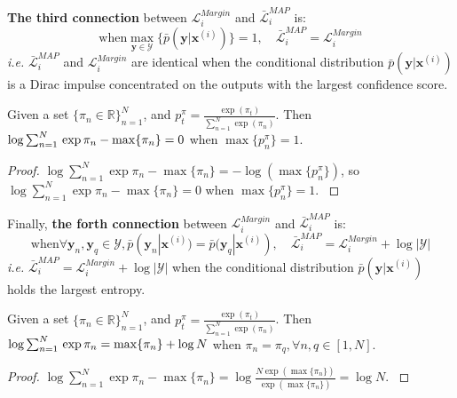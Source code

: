 \textbf{The third connection} between $\mathcal{L}^{Margin}_i$ and $\bar{\mathcal{L}}^{MAP}_i$ is: 
\begin{equation}
    \text{when} \max_{\mathbf{y}\in\mathcal{Y}}\{\bar{p}(\mathbf{y}|\mathbf{x}^{(i)})\}= 1, \quad \bar{\mathcal{L}}_i^{MAP}=\mathcal{L}^{Margin}_i 
    \label{equ:tight}
\end{equation}
\emph{i.e.} $\bar{\mathcal{L}}_i^{MAP}$ and $\mathcal{L}^{Margin}_i$ are identical when the conditional distribution $\bar{p}(\mathbf{y}|\mathbf{x}^{(i)})$ is a Dirac impulse concentrated on 
the outputs with the largest confidence score. 
\begin{proposition}
    Given a set $\{\pi_n\in\mathbb{R}\}_{n=1}^N$, and $p_t^\pi=\frac{\exp(\pi_t)}{\sum_{n=1}^N\exp(\pi_n)}$. Then $\log\sum_{n=1}^N\\\exp\pi_n-\max\{\pi_n\}=0$ when $\max\{p^\pi_n\}=1$.     
    \label{pro:bound}
\end{proposition}

\begin{proof}  
    $\log\sum_{n=1}^N\exp\pi_n-\max\{\pi_n\}=-\log (\max\{p^\pi_n\})$, so $\log\sum_{n=1}^N 
    \exp\pi_n-\max\{\pi_n\}=0$ when $\max\{p^\pi_n\}=1$.    
    \label{proof:bound}
\end{proof}

Finally, \textbf{the forth connection} between $\mathcal{L}^{Margin}_i$ and $\bar{\mathcal{L}}^{MAP}_i$ is: 
\begin{equation}
    \text{when} \forall \mathbf{y}_n,\mathbf{y}_q\in\mathcal{Y}, \bar{p}(\mathbf{y}_n|\mathbf{x}^{(i)})= \bar{p}(\mathbf{y}_q|\mathbf{x}^{(i)}), \quad \bar{\mathcal{L}}_i^{MAP}=\mathcal{L}^{Margin}_i+\log|\mathcal{Y}|  
    \label{equ:upper_bound}
\end{equation}
\emph{i.e.} $\bar{\mathcal{L}}_i^{MAP}=\mathcal{L}^{Margin}_i+\log|\mathcal{Y}|$ when the conditional distribution $\bar{p}(\mathbf{y}|\mathbf{x}^{(i)})$ holds the largest entropy.    
\begin{proposition}
    Given a set $\{\pi_n\in\mathbb{R}\}_{n=1}^N$, and $p_t^\pi=\frac{\exp(\pi_t)}{\sum_{n=1}^N\exp(\pi_n)}$. Then 
    $\log\sum_{n=1}^N\\ \exp\pi_n=\max\{\pi_n\}+\log N$ when $\pi_n=\pi_q, \forall n,q \in [1,N]$.  
    \label{pro:up_bound}
\end{proposition}
\begin{proof}  
    $\log\sum_{n=1}^N\exp\pi_n-\max\{\pi_n\}=\log\frac{N\exp(\max\{\pi_n\})}{\exp(\max\{\pi_n\})}=\log N$.    
    \label{proof:up_bound}
\end{proof}
 
